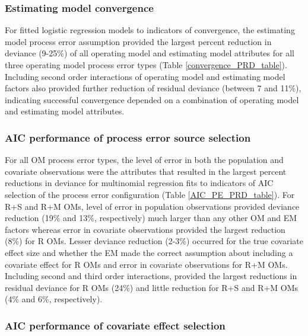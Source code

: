 \documentclass[
  12pt,
]{article}
\begin{document}
\subsubsection*{Estimating model
convergence}\label{estimating-model-convergence}

For fitted logistic regression models to indicators of convergence, the
estimating model process error assumption provided the largest percent
reduction in deviance (9-25\%) of all operating model and estimating
model attributes for all three operating model process error types
(Table \ref{convergence_PRD_table}). Including second order interactions
of operating model and estimating model factors also provided further
reduction of residual deviance (between 7 and 11\%), indicating
successful convergence depended on a combination of operating model and
estimating model attributes.

\subsubsection*{AIC performance of process error source
selection}\label{aic-performance-of-process-error-source-selection}

For all OM process error types, the level of error in both the
population and covariate observations were the attributes that resulted
in the largest percent reductions in deviance for multinomial regression
fits to indicators of AIC selection of the process error configuration
(Table \ref{AIC_PE_PRD_table}). For R+S and R+M OMs, level of error in
population observations provided deviance reduction (19\% and 13\%,
respectively) much larger than any other OM and EM factors whereas error
in covariate observations provided the largest reduction (8\%) for R
OMs. Lesser deviance reduction (2-3\%) occurred for the true covariate
effect size and whether the EM made the correct assumption about
including a covariate effect for R OMs and error in covariate
observations for R+M OMs. Including second and third order interactions,
provided the largest reductions in residual deviance for R OMs (24\%)
and little reduction for R+S and R+M OMs (4\% and 6\%, respectively).

\subsubsection*{AIC performance of covariate effect
selection}\label{aic-performance-of-covariate-effect-selection}
\end{document}
